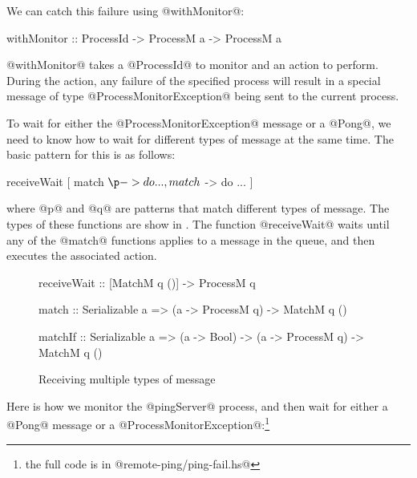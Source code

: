 We can catch this failure using @withMonitor@:

\begin{haskell}
withMonitor :: ProcessId -> ProcessM a -> ProcessM a
\end{haskell}

\noindent @withMonitor@ takes a @ProcessId@ to monitor and an action
to perform.  During the action, any failure of the specified process
will result in a special message of type @ProcessMonitorException@
being sent to the current process.

To wait for either the @ProcessMonitorException@ message or a @Pong@,
we need to know how to wait for different types of message at the same
time.  The basic pattern for this is as follows:

\begin{haskell}
  receiveWait
    [ match $ \p -> do ...
    , match $ \q -> do ...
    ]
\end{haskell}

\noindent where @p@ and @q@ are patterns that match different types of
message.  The types of these functions are show in
.  The function @receiveWait@ waits
until any of the @match@ functions applies to a message in the queue,
and then executes the associated action.

\begin{figure}
\begin{haskell}
receiveWait :: [MatchM q ()] -> ProcessM q

match   :: Serializable a
        => (a -> ProcessM q) -> MatchM q ()

matchIf :: Serializable a
        => (a -> Bool) -> (a -> ProcessM q) -> MatchM q ()
\end{haskell}
\label{fig:remote-receive-multi}
\caption{Receiving multiple types of message}
\end{figure}

Here is how we monitor the @pingServer@ process, and then wait for
either a @Pong@ message or a @ProcessMonitorException@:\footnote{the full code is in @remote-ping/ping-fail.hs@}



